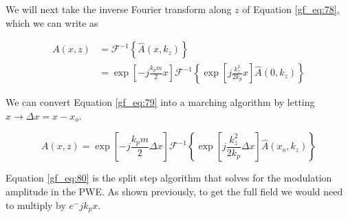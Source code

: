 We will next take the inverse Fourier transform along $z$ of Equation \ref{gf_eq:78}, which we can write as

\begin{equation}
\begin{aligned}
A(x,z) &= \mathcal{F}^{-1}\left\{\hat{A}(x,k_z) \right\} \\
&= \exp\left[-j\frac{k_pm}{2}x\right]\mathcal{F}^{-1}\left\{\exp\left[j\frac{k_z^2}{2k_p}x \right]\hat{A}(0,k_z) \right\}
\end{aligned}
\label{gf_eq:79}
\end{equation}
\renewcommand{\baselinestretch}{2} \small\normalsize

\noindent We can convert Equation \ref{gf_eq:79} into a marching algorithm by letting $x\rightarrow \Delta x = x-x_o$.

\begin{equation}
\boxed{A(x,z) = \exp\left[-j\frac{k_pm}{2}\Delta x\right]\mathcal{F}^{-1}\left\{\exp\left[j\frac{k_z^2}{2k_p}\Delta x \right]\hat{A}(x_o,k_z) \right\}}
\label{gf_eq:80}
\end{equation}
\renewcommand{\baselinestretch}{2} \small\normalsize

Equation \ref{gf_eq:80} is the split step algorithm that solves for the modulation amplitude in the PWE. As shown previously, to get the full field we would need to multiply by $e^-jk_px$.